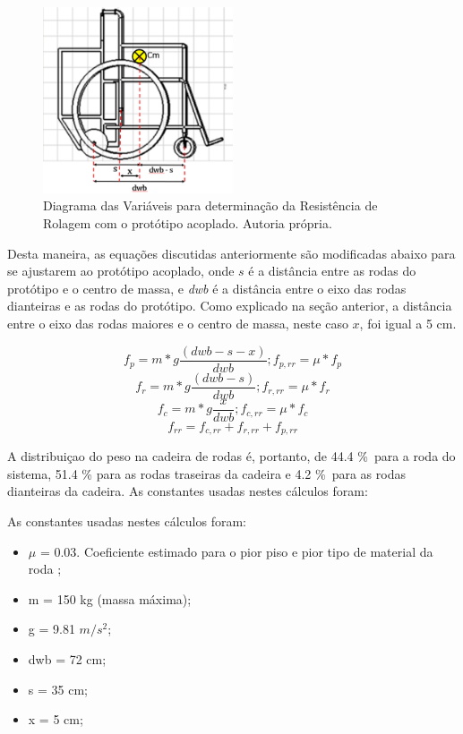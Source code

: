 \begin{figure}[!htb]
	\centering
	\includegraphics[width = 0.5\textwidth]{figuras/resultados/finalmente_essa_imagem}
	\caption{Diagrama das Variáveis para determinação da Resistência de Rolagem com o protótipo acoplado. Autoria própria.}
	\label{fig:finalmente_essa_imagem}
\end{figure}

Desta maneira, as equações discutidas anteriormente são modificadas abaixo para se ajustarem ao protótipo acoplado, onde $s$ é a distância entre as rodas do protótipo e o centro de massa, e \textit{dwb} é a distância entre o eixo das rodas dianteiras e as rodas do protótipo. Como explicado na seção anterior, a distância entre o eixo das rodas maiores e o centro de massa, neste caso $x$, foi igual a 5 cm.

\begin{equation}
	f_p=m*g\frac{(dwb-s-x)}{dwb} ; f_{p,rr}=\mu*f_p
\end{equation}
\begin{equation}
	f_r=m*g\frac{(dwb-s)}{dwb} ; f_{r,rr}=\mu*f_r
\end{equation}
\begin{equation}
	f_c=m*g\frac{x}{dwb} ; f_{c,rr}=\mu*f_c
\end{equation}
\begin{equation}
	f_{rr}=f_{c,rr}+f_{r,rr}+f_{p,rr}
\end{equation}

A distribuiçao do peso na cadeira de rodas é, portanto, de 44.4 \%\ para a roda do sistema, 51.4 \% para as rodas traseiras da cadeira e 4.2 \%\ para as rodas dianteiras da cadeira. As constantes usadas nestes cálculos foram:

As constantes usadas nestes cálculos foram:


\begin{itemize}
	\item $\mu$ = 0.03. Coeficiente estimado para o pior piso e pior tipo de material da roda \cite{rolling_resistance};
	\item m = 150 kg (massa máxima);
	\item g = 9.81 $m/s^2$;
	\item dwb = 72 cm;
	\item s = 35 cm;
	\item x = 5 cm;
\end{itemize}

